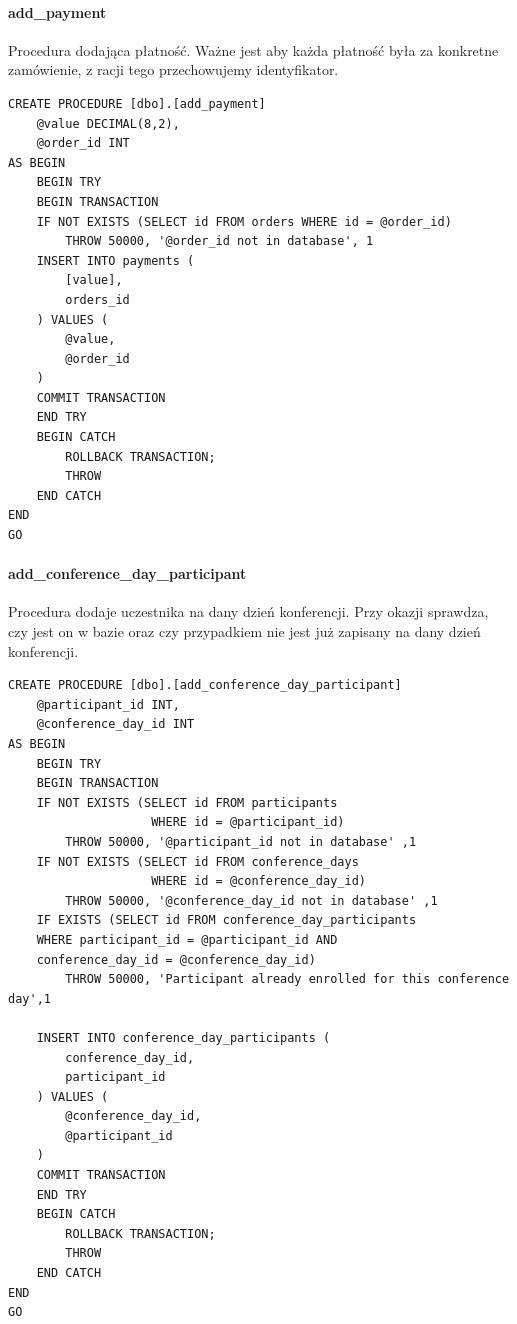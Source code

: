 \documentclass[12pt]{article}
\begin{document}
\paragraph{add\_payment \\}
Procedura dodająca płatność. Ważne jest aby każda płatność była za konkretne zamówienie, z racji tego przechowujemy identyfikator.\\
\begin{lstlisting}
CREATE PROCEDURE [dbo].[add_payment]
	@value DECIMAL(8,2),
	@order_id INT
AS BEGIN
	BEGIN TRY
	BEGIN TRANSACTION
	IF NOT EXISTS (SELECT id FROM orders WHERE id = @order_id)
		THROW 50000, '@order_id not in database', 1
	INSERT INTO payments (
		[value],
		orders_id
	) VALUES (
		@value,
		@order_id
	)
	COMMIT TRANSACTION
	END TRY
	BEGIN CATCH
		ROLLBACK TRANSACTION;
		THROW
	END CATCH
END
GO

\end{lstlisting}
\newpage
\paragraph{add\_conference\_day\_participant\\}
Procedura dodaje uczestnika na dany dzień konferencji. Przy okazji sprawdza, czy jest on w bazie oraz czy przypadkiem nie jest już zapisany na dany dzień konferencji.\\
\begin{lstlisting}
CREATE PROCEDURE [dbo].[add_conference_day_participant]
	@participant_id INT,
	@conference_day_id INT
AS BEGIN
	BEGIN TRY
	BEGIN TRANSACTION
	IF NOT EXISTS (SELECT id FROM participants
    				WHERE id = @participant_id)
		THROW 50000, '@participant_id not in database' ,1
	IF NOT EXISTS (SELECT id FROM conference_days
    				WHERE id = @conference_day_id)
		THROW 50000, '@conference_day_id not in database' ,1
	IF EXISTS (SELECT id FROM conference_day_participants
    WHERE participant_id = @participant_id AND
    conference_day_id = @conference_day_id)
		THROW 50000, 'Participant already enrolled for this conference day',1

	INSERT INTO conference_day_participants (
		conference_day_id,
		participant_id
	) VALUES (
		@conference_day_id,
		@participant_id
	)
	COMMIT TRANSACTION
	END TRY
	BEGIN CATCH
		ROLLBACK TRANSACTION;
		THROW
	END CATCH
END
GO
\end{lstlisting}
\newpage
\end{document}
